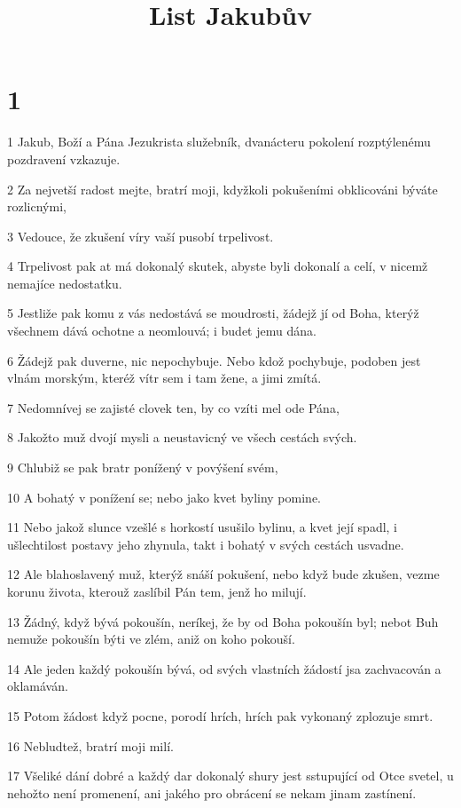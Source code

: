 

\title{List Jakubův}

\chapter{1}

\par 1 Jakub, Boží a Pána Jezukrista služebník, dvanácteru pokolení rozptýlenému pozdravení vzkazuje.
\par 2 Za nejvetší radost mejte, bratrí moji, kdyžkoli pokušeními obklicováni býváte rozlicnými,
\par 3 Vedouce, že zkušení víry vaší pusobí trpelivost.
\par 4 Trpelivost pak at má dokonalý skutek, abyste byli dokonalí a celí, v nicemž nemajíce nedostatku.
\par 5 Jestliže pak komu z vás nedostává se moudrosti, žádejž jí od Boha, kterýž všechnem dává ochotne a neomlouvá; i budet jemu dána.
\par 6 Žádejž pak duverne, nic nepochybuje. Nebo kdož pochybuje, podoben jest vlnám morským, kteréž vítr sem i tam žene, a jimi zmítá.
\par 7 Nedomnívej se zajisté clovek ten, by co vzíti mel ode Pána,
\par 8 Jakožto muž dvojí mysli a neustavicný ve všech cestách svých.
\par 9 Chlubiž se pak bratr ponížený v povýšení svém,
\par 10 A bohatý v ponížení se; nebo jako kvet byliny pomine.
\par 11 Nebo jakož slunce vzešlé s horkostí usušilo bylinu, a kvet její spadl, i ušlechtilost postavy jeho zhynula, takt i bohatý v svých cestách usvadne.
\par 12 Ale blahoslavený muž, kterýž snáší pokušení, nebo když bude zkušen, vezme korunu života, kterouž zaslíbil Pán tem, jenž ho milují.
\par 13 Žádný, když bývá pokoušín, neríkej, že by od Boha pokoušín byl; nebot Buh nemuže pokoušín býti ve zlém, aniž on koho pokouší.
\par 14 Ale jeden každý pokoušín bývá, od svých vlastních žádostí jsa zachvacován a oklamáván.
\par 15 Potom žádost když pocne, porodí hrích, hrích pak vykonaný zplozuje smrt.
\par 16 Nebludtež, bratrí moji milí.
\par 17 Všeliké dání dobré a každý dar dokonalý shury jest sstupující od Otce svetel, u nehožto není promenení, ani jakého pro obrácení se nekam jinam zastínení.

